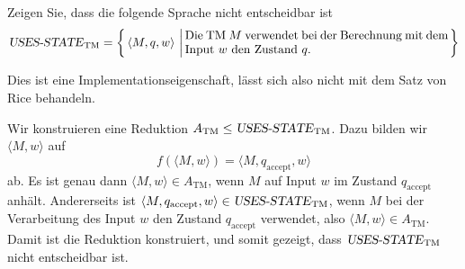 Zeigen Sie, dass die folgende  Sprache nicht entscheidbar ist
\[
\text{\textsl{USES-STATE}}_{\text{TM}}=
\left\{
\,
\langle M,q,w\rangle \,\left|\,
\begin{minipage}{3truein}Die TM $M$ verwendet bei der Berechnung mit
dem Input $w$ den Zustand $q$.
\end{minipage}\right.
\right\}
\]

\begin{hinweis}
Dies ist eine Implementationseigenschaft, lässt sich
also nicht mit dem Satz von Rice behandeln.
\end{hinweis}


\begin{loesung}
Wir konstruieren eine Reduktion
$A_{\text{TM}}\le \text{\textsl{USES-STATE}}_{\text{TM}}$.
Dazu bilden wir
$\langle M,w\rangle$
auf
\[
f(\langle M,w\rangle)=
\langle M,q_{\text{accept}},w\rangle
\]
ab. Es ist genau dann
$\langle M,w\rangle\in A_{\text{TM}}$, wenn $M$ auf Input $w$ im
Zustand $q_{\text{accept}}$ anhält.
Andererseits ist
$\langle M,q_{\text{accept}},w\rangle\in 
\text{\textsl{USES-STATE}}_{\text{TM}}$,
wenn $M$ bei der Verarbeitung
des Input $w$ den Zustand $q_{\text{accept}}$ verwendet, also
$\langle M,w\rangle\in A_{\text{TM}}$.
Damit ist die Reduktion konstruiert, und somit gezeigt, dass
$\text{\textsl{USES-STATE}}_{\text{TM}}$ nicht entscheidbar ist.
\end{loesung}

